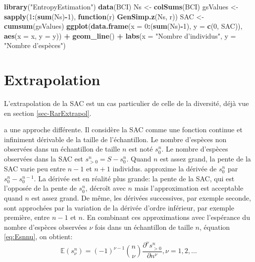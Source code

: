 \documentclass[
  11pt,
  french,
  a4paper,
  extrafontsizes,onecolumn,openright
  ]{memoir}
\newenvironment{Shaded}{\begin{snugshade}}{\end{snugshade}}
\newcommand{\ControlFlowTok}[1]{\textcolor[rgb]{0.13,0.29,0.53}{\textbf{#1}}}
\newcommand{\DataTypeTok}[1]{\textcolor[rgb]{0.13,0.29,0.53}{#1}}
\newcommand{\DecValTok}[1]{\textcolor[rgb]{0.00,0.00,0.81}{#1}}
\newcommand{\KeywordTok}[1]{\textcolor[rgb]{0.13,0.29,0.53}{\textbf{#1}}}
\newcommand{\NormalTok}[1]{#1}
\newcommand{\OperatorTok}[1]{\textcolor[rgb]{0.81,0.36,0.00}{\textbf{#1}}}
\newcommand{\StringTok}[1]{\textcolor[rgb]{0.31,0.60,0.02}{#1}}
\begin{document}
\scriptsize

\begin{Shaded}
\begin{Highlighting}[]
\KeywordTok{library}\NormalTok{(}\StringTok{"EntropyEstimation"}\NormalTok{)}
\KeywordTok{data}\NormalTok{(BCI)}
\NormalTok{Ns <-}\StringTok{ }\KeywordTok{colSums}\NormalTok{(BCI)}
\NormalTok{gsValues <-}\StringTok{ }\KeywordTok{sapply}\NormalTok{(}\DecValTok{1}\OperatorTok{:}\NormalTok{(}\KeywordTok{sum}\NormalTok{(Ns)}\OperatorTok{-}\DecValTok{1}\NormalTok{), }\ControlFlowTok{function}\NormalTok{(r) }\KeywordTok{GenSimp.z}\NormalTok{(Ns, r))}
\NormalTok{SAC <-}\StringTok{ }\KeywordTok{cumsum}\NormalTok{(gsValues)}
\KeywordTok{ggplot}\NormalTok{(}\KeywordTok{data.frame}\NormalTok{(}\DataTypeTok{x =} \DecValTok{0}\OperatorTok{:}\NormalTok{(}\KeywordTok{sum}\NormalTok{(Ns)}\OperatorTok{-}\DecValTok{1}\NormalTok{), }
                  \DataTypeTok{y =} \KeywordTok{c}\NormalTok{(}\DecValTok{0}\NormalTok{, SAC)), }
       \KeywordTok{aes}\NormalTok{(}\DataTypeTok{x =}\NormalTok{ x, }\DataTypeTok{y =}\NormalTok{ y)) }\OperatorTok{+}
\StringTok{  }\KeywordTok{geom_line}\NormalTok{() }\OperatorTok{+}
\StringTok{  }\KeywordTok{labs}\NormalTok{(}\DataTypeTok{x =} \StringTok{"Nombre d'individus"}\NormalTok{, }\DataTypeTok{y =} \StringTok{"Nombre d'espèces"}\NormalTok{)}
\end{Highlighting}
\end{Shaded}

\normalsize

\hypertarget{sec-Extrapolation}{%
\section{Extrapolation}\label{sec-Extrapolation}}

L'extrapolation de la SAC est un cas particulier de celle de la diversité, déjà vue en section \ref{sec-RarExtrapol}.

\textcite{Beguinot2015} a une approche différente.
Il considère la SAC comme une fonction continue et infiniment dérivable de la taille de l'échantillon.
Le nombre d'espèces non observées dans un échantillon de taille \(n\) est noté \(s^{n}_{0}\).
Le nombre d'espèces observées dans la SAC est \(s^{n}_{>0} = S - s^{n}_{0}\).
Quand \(n\) est assez grand, la pente de la SAC varie peu entre \(n-1\) et \(n+1\) individus.
\textcite{Beguinot2014} approxime la dérivée de \(s^{n}_{0}\) par \(s^{n}_{0}-s^{n-1}_{0}\).
La dérivée est en réalité plus grande: la pente de la SAC, qui est l'opposée de la pente de \(s^{n}_{0}\), décroît avec \(n\) mais l'approximation est acceptable quand \(n\) est assez grand.
De même, les dérivées successives, par exemple seconde, sont approchées par la variation de la dérivée d'ordre inférieur, par exemple première, entre \(n-1\) et \(n\).
En combinant ces approximations avec l'espérance du nombre d'espèces observées \(\nu\) fois dans un échantillon de taille \(n\), équation \eqref{eq:Esnnu}, on obtient:
\begin{equation}
  \label{eq:Beguinot2014}
  {\mathbb E}\left( s^{n}_{\nu} \right) 
  = \left(-1 \right)^{\nu-1} \binom{n}{\nu} \frac{\partial^\nu s^{n}_{>0}}{\partial n^\nu}, \nu=1,2,\dots
\end{equation}
\end{document}
